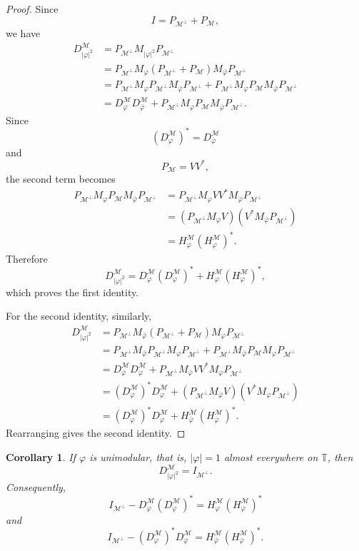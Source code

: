 \documentclass[12pt]{amsart}
\newtheorem{corollary}[theorem]{Corollary}
\theoremstyle{definition}
\theoremstyle{remark}
\def \T{\mathbb{T}}
\newcommand{\clm}{\mathcal{M}}
\newcommand{\vp}{\varphi}
\numberwithin{equation}{section}
\begin{document}
\begin{proof}
Since
\[
I=P_{\clm^\perp}+P_\clm,
\]
we have
\begin{align*}
D_{|\vp|^2}^\clm
&=
P_{\clm^\perp}M_{|\vp|^2}P_{\clm^\perp}  \\
&=
P_{\clm^\perp}M_\vp
(P_{\clm^\perp}+P_\clm)
M_{\bar\vp}P_{\clm^\perp} \\
&=
P_{\clm^\perp}M_\vp P_{\clm^\perp}M_{\bar\vp}P_{\clm^\perp}
+
P_{\clm^\perp}M_\vp P_\clm M_{\bar\vp}P_{\clm^\perp} \\
&=
D_\vp^\clm D_{\bar\vp}^\clm
+
P_{\clm^\perp}M_\vp P_\clm M_{\bar\vp}P_{\clm^\perp}.
\end{align*}
Since
\[
(D_\vp^\clm)^*=D_{\bar\vp}^\clm
\]
and
\[
P_\clm=VV^*,
\]
the second term becomes
\begin{align*}
P_{\clm^\perp}M_\vp P_\clm M_{\bar\vp}P_{\clm^\perp}
&=
P_{\clm^\perp}M_\vp VV^*M_{\bar\vp}P_{\clm^\perp} \\
&=
(P_{\clm^\perp}M_\vp V)(V^*M_{\bar\vp}P_{\clm^\perp}) \\
&=
H_\vp^\clm(H_\vp^\clm)^*.
\end{align*}
Therefore
\[
D_{|\vp|^2}^\clm
=
D_\vp^\clm(D_\vp^\clm)^*
+
H_\vp^\clm(H_\vp^\clm)^*,
\]
which proves the first identity.

For the second identity, similarly,
\begin{align*}
D_{|\vp|^2}^\clm
&=
P_{\clm^\perp}M_{\bar\vp}
(P_{\clm^\perp}+P_\clm)
M_\vp P_{\clm^\perp} \\
&=
P_{\clm^\perp}M_{\bar\vp}P_{\clm^\perp}M_\vp P_{\clm^\perp}
+
P_{\clm^\perp}M_{\bar\vp}P_\clm M_\vp P_{\clm^\perp} \\
&=
D_{\bar\vp}^\clm D_\vp^\clm
+
P_{\clm^\perp}M_{\bar\vp}VV^*M_\vp P_{\clm^\perp} \\
&=
(D_\vp^\clm)^*D_\vp^\clm
+
(P_{\clm^\perp}M_{\bar\vp}V)(V^*M_\vp P_{\clm^\perp}) \\
&=
(D_\vp^\clm)^*D_\vp^\clm
+
H_{\bar\vp}^\clm(H_{\bar\vp}^\clm)^*.
\end{align*}
Rearranging gives the second identity.
\end{proof}

\begin{corollary}
If $\vp$ is unimodular, that is, $|\vp|=1$ almost everywhere on $\T$, then
\[
D_{|\vp|^2}^\clm=I_{\clm^\perp}.
\]
Consequently,
\[
I_{\clm^\perp}
-
D_\vp^\clm(D_\vp^\clm)^*
=
H_\vp^\clm(H_\vp^\clm)^*
\]
and
\[
I_{\clm^\perp}
-
(D_\vp^\clm)^*D_\vp^\clm
=
H_{\bar\vp}^\clm(H_{\bar\vp}^\clm)^*.
\]
\end{corollary}
\end{document}

